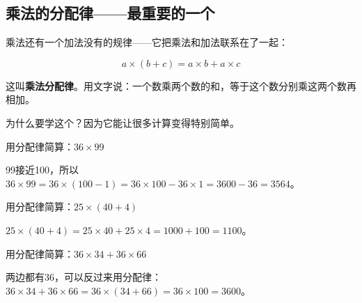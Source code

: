 \subsection*{乘法的分配律——最重要的一个}

乘法还有一个加法没有的规律——它把乘法和加法联系在了一起：

\[
a\times(b+c) = a\times b + a\times c
\]

这叫\textbf{乘法分配律}。用文字说：一个数乘两个数的和，等于这个数分别乘这两个数再相加。

为什么要学这个？因为它能让很多计算变得特别简单。

\begin{example}
用分配律简算：$36\times99$
\end{example}
\begin{solution}
99接近100，所以 $36\times99 = 36\times(100-1) = 36\times100 - 36\times1 = 3600-36 = 3564$。
\end{solution}

\begin{example}
用分配律简算：$25\times(40+4)$
\end{example}
\begin{solution}
$25\times(40+4) = 25\times40 + 25\times4 = 1000+100 = 1100$。
\end{solution}

\begin{example}
用分配律简算：$36\times34+36\times66$
\end{example}
\begin{solution}
两边都有36，可以反过来用分配律：
$36\times34+36\times66 = 36\times(34+66) = 36\times100 = 3600$。
\end{solution}

